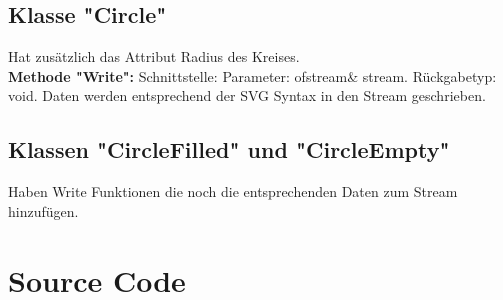 \documentclass[12pt,a4paper]{article}
\begin{document}
\subsection {Klasse "Circle"}
Hat zusätzlich das Attribut Radius des Kreises.
\\

\textbf {Methode "Write": } 
\newline
Schnittstelle:
Parameter: ofstream\& stream.
\newline
Rückgabetyp: void.
\newline
Daten werden entsprechend der SVG Syntax in den Stream geschrieben.
\\

\subsection {Klassen "CircleFilled" und "CircleEmpty"}
Haben Write Funktionen die noch die entsprechenden Daten zum Stream hinzufügen.
\\

\newpage
\section {Source Code}



\newpage


\newpage


\newpage

\newpage


\newpage

\newpage


\newpage


\newpage

\newpage


\newpage

\newpage


\newpage

\newpage
\end{document}
